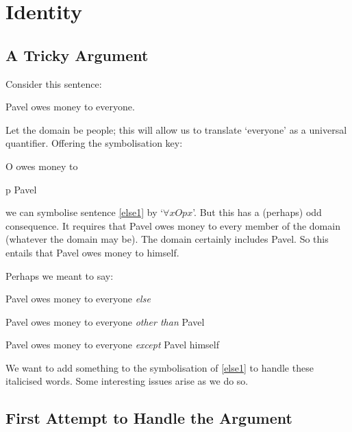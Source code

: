 \chapter{Identity}\label{sec.identity}

\section{A Tricky Argument}

Consider this sentence:
\begin{earg}
\item[\ex{else1}] Pavel owes money to everyone.
\end{earg}
Let the domain be people; this will allow us to translate `everyone' as a universal quantifier. Offering the symbolisation key:
	\begin{ekey}
		\item[O]  owes money to 
		\item[p] Pavel
	\end{ekey}
we can symbolise sentence \ref{else1} by `$\forall x Opx$'. But this has a (perhaps) odd consequence. It requires that Pavel owes money to every member of the domain (whatever the domain may be). The domain certainly includes Pavel. So this entails that Pavel owes money to himself. 

Perhaps we meant to say:
	\begin{earg}
		\item[\ex{else1b}] Pavel owes money to everyone \emph{else}
		\item[\ex{else1c}] Pavel owes money to everyone \emph{other than} Pavel
		\item[\ex{else1d}] Pavel owes money to everyone \emph{except} Pavel himself
	\end{earg}
We want to add something to the symbolisation of \ref{else1} to handle these italicised words. Some interesting issues arise as we do so.


\section{First Attempt to Handle the Argument}

